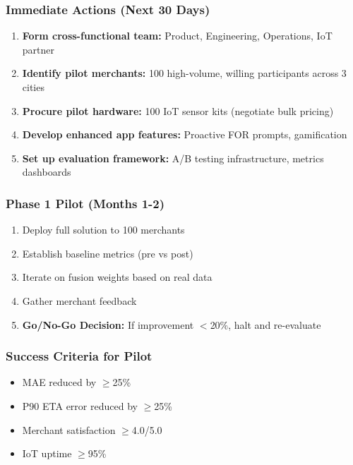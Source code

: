 \documentclass[11pt,a4paper]{article}
\begin{document}
\subsubsection{Immediate Actions (Next 30 Days)}

\begin{enumerate}[leftmargin=*]
    \item \textbf{Form cross-functional team:} Product, Engineering, Operations, IoT partner
    \item \textbf{Identify pilot merchants:} 100 high-volume, willing participants across 3 cities
    \item \textbf{Procure pilot hardware:} 100 IoT sensor kits (negotiate bulk pricing)
    \item \textbf{Develop enhanced app features:} Proactive FOR prompts, gamification
    \item \textbf{Set up evaluation framework:} A/B testing infrastructure, metrics dashboards
\end{enumerate}

\subsubsection{Phase 1 Pilot (Months 1-2)}

\begin{enumerate}[leftmargin=*]
    \item Deploy full solution to 100 merchants
    \item Establish baseline metrics (pre vs post)
    \item Iterate on fusion weights based on real data
    \item Gather merchant feedback
    \item \textbf{Go/No-Go Decision:} If improvement $<$20\%, halt and re-evaluate
\end{enumerate}

\subsubsection{Success Criteria for Pilot}

\begin{itemize}[leftmargin=*]
    \item MAE reduced by $\geq$25\%
    \item P90 ETA error reduced by $\geq$25\%
    \item Merchant satisfaction $\geq$4.0/5.0
    \item IoT uptime $\geq$95\%
\end{itemize}
\end{document}
